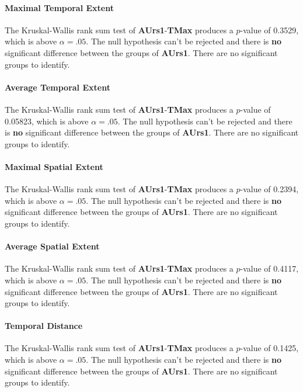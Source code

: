 \paragraph{Maximal Temporal Extent}
The Kruskal-Wallis rank sum test of \textbf{AUrs1}-\textbf{TMax} produces a $p$-value of 0.3529, which is above $\alpha=.05$. The null hypothesis can't be rejected and there is \textbf{no} significant difference between the groups of \textbf{AUrs1}. There are no significant groups to identify.
\paragraph{Average Temporal Extent}
The Kruskal-Wallis rank sum test of \textbf{AUrs1}-\textbf{TMax} produces a $p$-value of 0.05823, which is above $\alpha=.05$. The null hypothesis can't be rejected and there is \textbf{no} significant difference between the groups of \textbf{AUrs1}. There are no significant groups to identify.
\paragraph{Maximal Spatial Extent}
The Kruskal-Wallis rank sum test of \textbf{AUrs1}-\textbf{TMax} produces a $p$-value of 0.2394, which is above $\alpha=.05$. The null hypothesis can't be rejected and there is \textbf{no} significant difference between the groups of \textbf{AUrs1}. There are no significant groups to identify.
\paragraph{Average Spatial Extent}
The Kruskal-Wallis rank sum test of \textbf{AUrs1}-\textbf{TMax} produces a $p$-value of 0.4117, which is above $\alpha=.05$. The null hypothesis can't be rejected and there is \textbf{no} significant difference between the groups of \textbf{AUrs1}. There are no significant groups to identify.
\paragraph{Temporal Distance}
The Kruskal-Wallis rank sum test of \textbf{AUrs1}-\textbf{TMax} produces a $p$-value of 0.1425, which is above $\alpha=.05$. The null hypothesis can't be rejected and there is \textbf{no} significant difference between the groups of \textbf{AUrs1}. There are no significant groups to identify.
